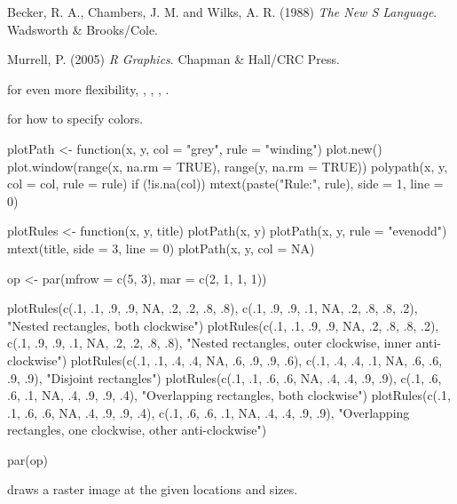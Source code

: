 %
\begin{References}\relax
Becker, R. A., Chambers, J. M. and Wilks, A. R. (1988)
\emph{The New S Language}.
Wadsworth \& Brooks/Cole.

Murrell, P. (2005) \emph{R Graphics}. Chapman \& Hall/CRC Press.
\end{References}
%
\begin{SeeAlso}\relax
{} for even more flexibility, ,
, , .

 for how to specify colors.
\end{SeeAlso}
%
\begin{Examples}
\begin{ExampleCode}
plotPath <- function(x, y, col = "grey", rule = "winding") {
    plot.new()
    plot.window(range(x, na.rm = TRUE), range(y, na.rm = TRUE))
    polypath(x, y, col = col, rule = rule)
    if (!is.na(col))
        mtext(paste("Rule:", rule), side = 1, line = 0)
}

plotRules <- function(x, y, title) {
    plotPath(x, y)
    plotPath(x, y, rule = "evenodd")
    mtext(title, side = 3, line = 0)
    plotPath(x, y, col = NA)
}

op <- par(mfrow = c(5, 3), mar = c(2, 1, 1, 1))

plotRules(c(.1, .1, .9, .9, NA, .2, .2, .8, .8),
          c(.1, .9, .9, .1, NA, .2, .8, .8, .2),
          "Nested rectangles, both clockwise")
plotRules(c(.1, .1, .9, .9, NA, .2, .8, .8, .2),
          c(.1, .9, .9, .1, NA, .2, .2, .8, .8),
          "Nested rectangles, outer clockwise, inner anti-clockwise")
plotRules(c(.1, .1, .4, .4, NA, .6, .9, .9, .6),
          c(.1, .4, .4, .1, NA, .6, .6, .9, .9),
          "Disjoint rectangles")
plotRules(c(.1, .1, .6, .6, NA, .4, .4, .9, .9),
          c(.1, .6, .6, .1, NA, .4, .9, .9, .4),
          "Overlapping rectangles, both clockwise")
plotRules(c(.1, .1, .6, .6, NA, .4, .9, .9, .4),
          c(.1, .6, .6, .1, NA, .4, .4, .9, .9),
          "Overlapping rectangles, one clockwise, other anti-clockwise")

par(op)
\end{ExampleCode}
\end{Examples}
%
\begin{Description}\relax
{} draws a raster image at the given locations and sizes.
\end{Description}
